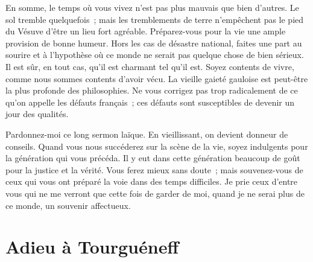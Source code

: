 \documentclass[french,twoside]{book} %
\newcommand\persName[1]{#1}
\newcommand\placeName[1]{#1}
\begin{document}
En somme, le temps où vous vivez n’est pas plus mauvais que bien d’autres. Le sol tremble quelquefois ; mais les tremblements de terre n’empêchent pas le pied du {\placeName Vésuve} d’être un lieu fort agréable. Préparez-vous pour la vie une ample provision de bonne humeur. Hors les cas de désastre national, faites une part au sourire et à l’hypothèse où ce monde ne serait pas quelque chose de bien sérieux. Il est sûr, en tout cas, qu’il est charmant tel qu’il est. Soyez contents de vivre, comme nous sommes contents d’avoir vécu. La vieille gaieté gauloise est peut-être la plus profonde des philosophies. Ne vous corrigez pas trop radicalement de ce qu’on appelle les défauts français ; ces défauts sont susceptibles de devenir un jour des qualités.\par
Pardonnez-moi ce long sermon laïque. En vieillissant, on devient donneur de conseils. Quand vous nous succéderez sur la scène de la vie, soyez indulgents pour la génération qui vous précéda. Il y eut dans cette génération beaucoup de goût pour la justice et la vérité. Vous ferez mieux sans doute ; mais souvenez-vous de ceux qui vous ont préparé la voie dans des temps difficiles. Je prie ceux d’entre vous qui ne me verront que cette fois de garder de moi, quand je ne serai plus de ce monde, un souvenir affectueux.
\section[{Adieu à Tourguéneff}]{Adieu à {\persName Tourguéneff}}\renewcommand{\leftmark}{Adieu à {\persName Tourguéneff}}
\end{document}
